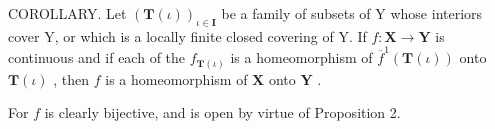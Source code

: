 COROLLARY. Let \((\mathbf{T}(\iota))_{\iota \in \mathbf{I}}\) be a family of subsets of Y whose interiors cover Y, or which is a locally finite closed covering of Y. If \(f: \mathbf{X} \to \mathbf{Y}\) is continuous and if each of the \(f_{\mathbf{T}(\iota)}\) is a homeomorphism of \(\overline{f}^1 (\mathbf{T}(\iota))\) onto \(\mathbf{T}(\iota)\) , then \(f\) is a homeomorphism of \(\mathbf{X}\) onto \(\mathbf{Y}\) .

For \(f\) is clearly bijective, and is open by virtue of Proposition 2.

